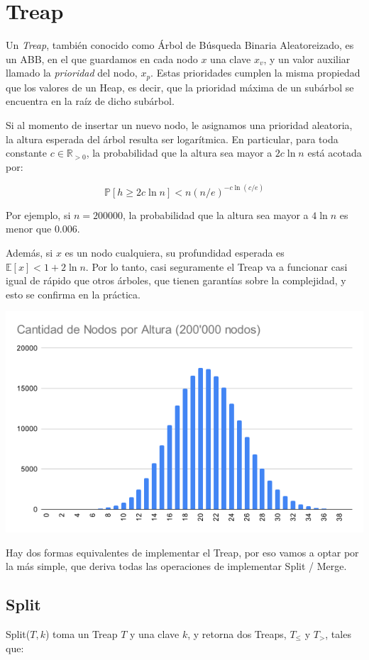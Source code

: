\section{Treap}

Un \textit{Treap}, también conocido como Árbol de Búsqueda Binaria Aleatoreizado, es un ABB, en el que guardamos en cada nodo \(x\) una clave \(x_v\), y
un valor auxiliar llamado la \textit{prioridad} del nodo, \(x_p\). 
Estas prioridades cumplen la misma propiedad que los valores de un Heap, es decir, que la prioridad máxima de un subárbol
se encuentra en la raíz de dicho subárbol.

Si al momento de insertar un nuevo nodo, le asignamos una prioridad aleatoria,
la altura esperada del árbol resulta ser logarítmica. En particular, para toda constante \(c \in \mathbb{R}_{>0}\), la probabilidad que la altura sea mayor a \(2c \ln n\) está acotada por:

\[
\mathbb{P}[h \geq 2c \ln n] < n(n/e)^{-c \ln(c/e)}
\]

Por ejemplo, si \(n = 200000\), la probabilidad que la altura sea mayor a \(4 \ln n\) es menor que \(0.006\).

Además, si \(x\) es un nodo cualquiera, su profundidad esperada es \(\mathbb{E}[x] < 1 + 2 \ln n\). 
Por lo tanto, casi seguramente el Treap va a funcionar casi igual de rápido que otros árboles, que tienen garantías sobre la complejidad, y esto se confirma en la práctica.

\includegraphics[width=0.8\linewidth]{Diagramas/distribucion_nodos.png}

Hay dos formas equivalentes de implementar el Treap, por eso vamos a optar por la más simple, que deriva todas las operaciones de implementar Split / Merge.

\subsection{Split}
Split(\(T, k\)) toma un Treap \(T\) y una clave \(k\), y retorna dos Treaps, \(T_\leq\) y \(T_>\), tales que:

